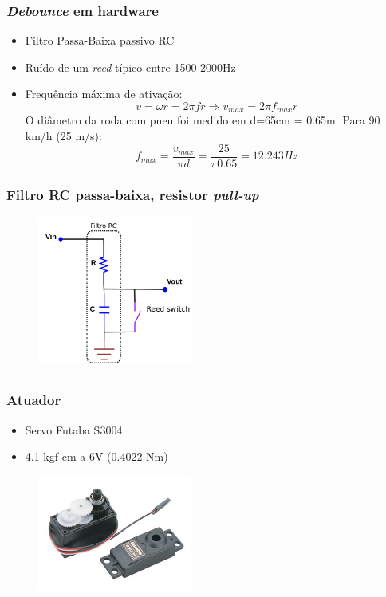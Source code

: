 \documentclass{beamer}
\begin{document}
\begin{frame}
 \frametitle{\textit{Debounce} em hardware}
  \begin{itemize}
    \item Filtro Passa-Baixa passivo RC
    \item Ruído de um \textit{reed} típico entre 1500-2000Hz
    \item Frequência máxima de ativação:
    \begin{equation}
  v = \omega r = 2\pi f r \Rightarrow v_{max} = 2\pi f_{max} r
\end{equation}
O diâmetro da roda com pneu foi medido em d=65cm = 0.65m. Para 90
km/h (25 m/s):
\begin{equation}
  f_{max} = \frac{\displaystyle v_{max}}{\displaystyle \pi d} =
\frac{\displaystyle 25}{\displaystyle \pi 0.65} = 12.243 Hz
\end{equation}

  \end{itemize}
\end{frame}

\begin{frame}
  \frametitle{Filtro RC passa-baixa, resistor \textit{pull-up}}
  \begin{center}
    \begin{figure}
      \includegraphics[width=2in]{lowpass}
    \end{figure}
  \end{center}
\end{frame}


\subsection{}
\begin{frame}
  \frametitle{Atuador}
  \begin{itemize}
    \item Servo Futaba S3004
    \item 4.1 kgf-cm a 6V (0.4022 Nm)
  \end{itemize}
\begin{figure}[ht]
 \begin{center}
  \includegraphics[width=2in]{S3004}
 \end{center}
\end{figure}
\end{frame}
\end{document}
